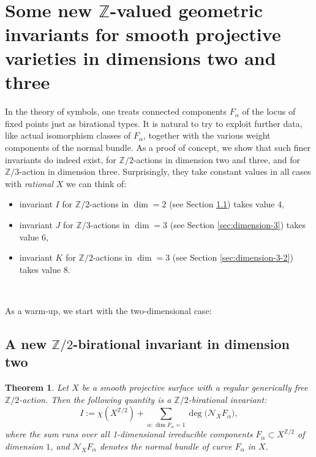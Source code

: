 \documentclass[12pt,a4paper]{amsart}
\newtheorem{theorem}{Theorem}[section]
\theoremstyle{definition}
\theoremstyle{remark}
\newcommand{\Z}{\mathbb{Z}}
\begin{document}
 \ 

 
\section{Some new $\mathbb Z$-valued geometric invariants for smooth projective varieties in dimensions two and three}
\label{sec:geometric}


In the theory of symbols, one treats connected components $F_\alpha$ of the locus of fixed points just as birational types.
 It is natural to try to exploit further data, like actual isomorphism classes of $F_\alpha$, together with the various weight components of the normal bundle. As a proof of concept, we show that such finer invariants do indeed exist, for $\Z/2$-actions in dimension two and three, and for $\Z/3$-action in dimension three. Surprisingly, they take constant values in all  cases with \textit{rational} $X$ we can think of:
 \begin{itemize}
     \item invariant $I$ for $\Z/2$-actions in $\dim=2$ (see Section \ref{sec:dimension-2}) takes value $4$,
     \item invariant $J$ for $\Z/3$-actions in $\dim=3$ (see Section \ref{sec:dimension-3}) takes value $6$,
     \item invariant $K$ for $\Z/2$-actions in $\dim=3$ (see Section \ref{sec:dimension-3-2}) takes value $8$.
 \end{itemize}




\ 

As a warm-up, we start with the two-dimensional case:

\subsection{A new $\mathbb Z/2$-birational invariant in dimension two}
\label{sec:dimension-2}

\begin{theorem}\label{thm:degrees}
Let \( X \) be a smooth projective surface with a regular generically free \( \mathbb{Z}/2 \)-action. Then the following quantity is a \( \mathbb{Z}/2 \)-birational invariant:
\[
I:=\chi(X^{\mathbb{Z}/2}) + \sum_{\alpha:\dim F_\alpha=1} \deg\big( \mathcal{N}_X F_\alpha \big),
\]
where the sum runs over all 1-dimensional irreducible components \( F_\alpha \subset X^{\mathbb{Z}/2} \) of dimension $1$, and \( \mathcal{N}_X F_\alpha \) denotes the normal bundle of curve \( F_\alpha \) in \( X \).
\end{theorem}
\end{document}
